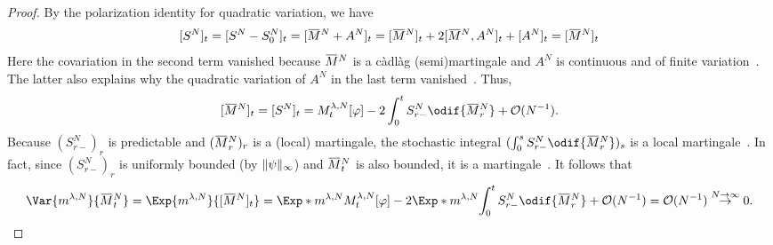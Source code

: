 \begin{proof}
  By the polarization identity for quadratic variation, we have
  \begin{equation}
    \sbr{S^N}_t
    = \sbr{S^N - S_0^N}_t
    = \sbr{\ol{M}^N + A^N}_t
    = \sbr{\ol{M}^N}_t + 2 \sbr{ \ol{M}^N, A^N }_t + \sbr{ A^N }_t
    = \sbr{\ol{M}^N}_t
  \end{equation}
  Here the covariation in the second term vanished because \( \ol{M}^N \) is a càdlàg (semi)martingale and \( A^N \) is continuous and of finite variation~\cite[Cor. 8.5]{klebanerIntroductionStochasticCalculus2012}. %
  The latter also explains why the quadratic variation of \( A^N \) in the last term vanished~\cite[Th. 1.10]{klebanerIntroductionStochasticCalculus2012}.
  Thus,
  \begin{equation}
    \sbr{\ol{M}^N}_t = \sbr{S^N}_t = M_t^{\lambda, N}[\varphi] - 2 \int_0^t S_{r-}^N \odif{\ol{M}_r^N} + \mathcal{O}(N^{-1}).
  \end{equation}
  Because \( ( S_{r-}^N )_r \) is predictable and \( ( \ol{M}_r^N )_r \) is a (local) martingale, the stochastic integral \( ( \int_0^s S_{r-}^N \odif{\ol{M}_r^N} )_s \) is a local martingale~\cite[218]{klebanerIntroductionStochasticCalculus2012}.
  In fact, since \( (S_{r-}^N)_r \) is uniformly bounded (by \( \lVert\psi\rVert_\infty \)) and \( \ol{M}_t^N \) is also bounded, %
  it is a martingale~\cite[Cor. 7.22]{klebanerIntroductionStochasticCalculus2012}.
  It follows that
  \begin{equation}
    \Var{\lawmu^{\lambda,N}}{\ol{M}_t^N}
    = \Exp{\lawmu^{\lambda,N}}{\sbr{\ol{M}^N}_t}
    = \Exp*{\lawmu^{\lambda,N}}{M_t^{\lambda, N}\sbr*{ \varphi }} - 2 \Exp*{\lawmu^{\lambda,N}}{\int_0^t S_{r-}^N \odif{\ol{M}_r^N}} + \mathcal{O}(N^{-1})
    = \mathcal{O}(N^{-1}) \overset{N\to\infty}{\to} 0.
  \end{equation}
\end{proof}
